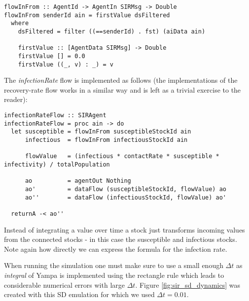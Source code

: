 \begin{verbatim}
flowInFrom :: AgentId -> AgentIn SIRMsg -> Double
flowInFrom senderId ain = firstValue dsFiltered
  where 
    dsFiltered = filter ((==senderId) . fst) (aiData ain)

    firstValue :: [AgentData SIRMsg] -> Double
    firstValue [] = 0.0
    firstValue ((_, v) : _) = v
\end{verbatim}
	
The \textit{infectionRate} flow is implemented as follows (the implementations of the recovery-rate flow works in a similar way and is left as a trivial exercise to the reader):

\begin{verbatim}
infectionRateFlow :: SIRAgent
infectionRateFlow = proc ain -> do
  let susceptible = flowInFrom susceptibleStockId ain 
      infectious  = flowInFrom infectiousStockId ain

      flowValue   = (infectious * contactRate * susceptible * infectivity) / totalPopulation
  
      ao          = agentOut Nothing
      ao'         = dataFlow (susceptibleStockId, flowValue) ao
      ao''        = dataFlow (infectiousStockId, flowValue) ao'
      
  returnA -< ao''
\end{verbatim}

Instead of integrating a value over time a stock just transforms incoming values from the connected stocks - in this case the susceptible and infectious stocks. Note again how directly we can express the formula for the infection rate.

When running the simulation one must make sure to use a small enough $\Delta t$ as \textit{integral} of Yampa is implemented using the rectangle rule which leads to considerable numerical errors with large $\Delta t$. Figure \ref{fig:sir_sd_dynamics} was created with this SD emulation for which we used $\Delta t = 0.01$.


